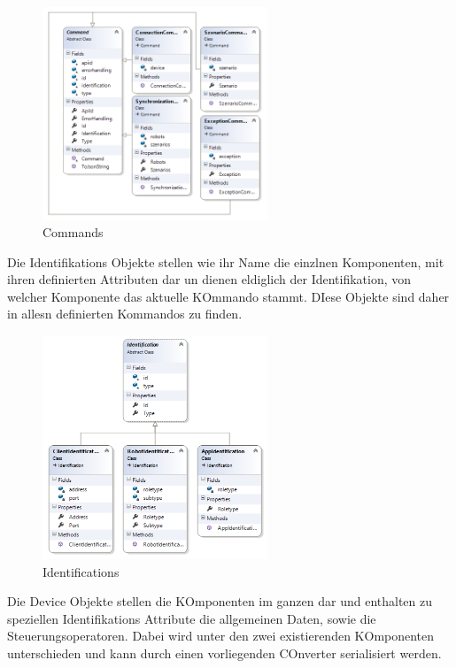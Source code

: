\begin{figure}[h]
	\begin{center}
		\includegraphics[width=0.6\textwidth]{images/uml/commands.png}
	\end{center}
	\caption{Commands}
	\label{fig:commands_classdiagram}
\end{figure}

\newpage
Die Identifikations Objekte stellen wie ihr Name die einzlnen Komponenten, mit ihren definierten Attributen dar un dienen eldiglich der Identifikation, von welcher Komponente das aktuelle KOmmando stammt. DIese Objekte sind daher in allesn definierten Kommandos zu finden.

\begin{figure}[h]
	\begin{center}
		\includegraphics[width=0.6\textwidth]{images/uml/identification.png}
	\end{center}
	\caption{Identifications}
	\label{fig:identification_classdiagram}
\end{figure}

\newpage
Die Device Objekte stellen die KOmponenten im ganzen dar und enthalten zu speziellen Identifikations Attribute die allgemeinen Daten, sowie die Steuerungsoperatoren. Dabei wird unter den zwei existierenden KOmponenten unterschieden und kann durch einen vorliegenden COnverter serialisiert werden.

